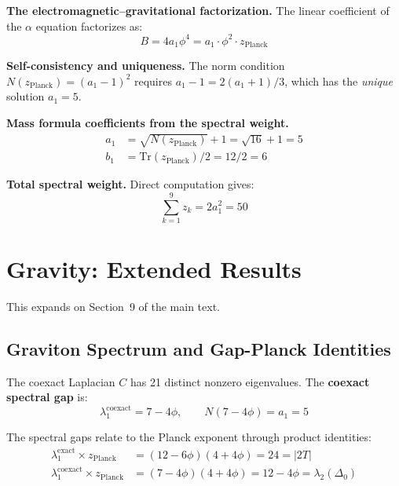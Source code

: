 \documentclass[12pt,a4paper]{article}
\theoremstyle{definition}
\begin{document}
\textbf{The electromagnetic--gravitational factorization.}  The linear coefficient of the $\alpha$ equation factorizes as:
\begin{equation}
B = 4a_1\phi^4 = a_1 \cdot \phi^2 \cdot z_{\text{Planck}}
\end{equation}

\textbf{Self-consistency and uniqueness.}  The norm condition $N(z_{\text{Planck}}) = (a_1-1)^2$ requires $a_1 - 1 = 2(a_1+1)/3$, which has the \emph{unique} solution $a_1 = 5$.

\textbf{Mass formula coefficients from the spectral weight.}
\begin{align}
a_1 &= \sqrt{N(z_{\text{Planck}})} + 1 = \sqrt{16} + 1 = 5 \\
b_1 &= \text{Tr}(z_{\text{Planck}})/2 = 12/2 = 6
\end{align}

\textbf{Total spectral weight.}  Direct computation gives:
\begin{equation}
\sum_{k=1}^{9} z_k = 2a_1^2 = 50
\end{equation}


\section{Gravity: Extended Results}
\label{sec:S-gravity}

This expands on Section~9 of the main text.

\subsection{Graviton Spectrum and Gap-Planck Identities}

The coexact Laplacian $C$ has 21 distinct nonzero eigenvalues.  The \textbf{coexact spectral gap} is:
\begin{equation}
\lambda_1^{\text{coexact}} = 7 - 4\phi, \qquad N(7-4\phi) = a_1 = 5
\end{equation}

The spectral gaps relate to the Planck exponent through product identities:
\begin{align}
\lambda_1^{\text{exact}} \times z_{\text{Planck}} &= (12 - 6\phi)(4 + 4\phi) = 24 = |2T| \\
\lambda_1^{\text{coexact}} \times z_{\text{Planck}} &= (7 - 4\phi)(4 + 4\phi) = 12 - 4\phi = \lambda_2(\Delta_0)
\end{align}
\end{document}
